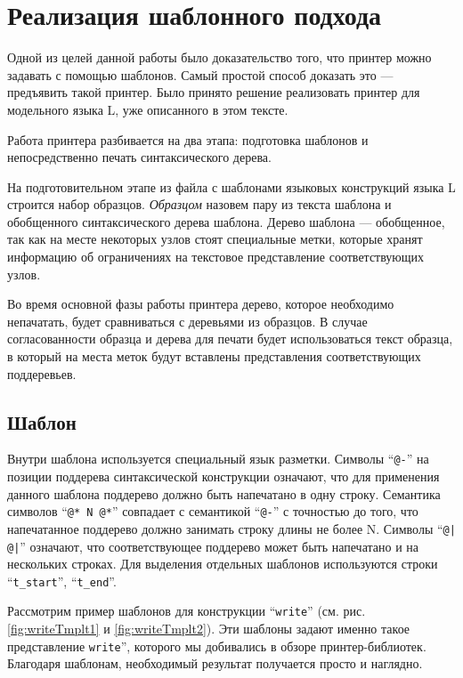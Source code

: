 \section{Реализация шаблонного подхода}

Одной из целей данной работы было доказательство того, что принтер можно задавать с помощью шаблонов.
Самый простой способ доказать это --- предъявить такой принтер. Было принято решение реализовать принтер для модельного языка L, уже описанного в этом тексте.

Работа принтера разбивается на два этапа: подготовка шаблонов и непосредственно печать синтаксического дерева.

На подготовительном этапе из файла с шаблонами языковых конструкций языка L строится набор образцов. \textit{Образцом} назовем пару из текста шаблона и обобщенного синтаксического дерева шаблона. Дерево шаблона --- обобщенное, так как на месте некоторых узлов стоят специальные метки, которые хранят информацию об ограничениях на текстовое представление соответствующих узлов.

Во время основной фазы работы принтера дерево, которое необходимо непачатать, будет сравниваться с деревьями из образцов. В случае согласованности образца и дерева для печати будет использоваться текст образца, в который на места меток будут вставлены представления соответствующих поддеревьев.

\subsection{Шаблон}

Внутри шаблона используется специальный язык разметки. Символы “\lstinline{@-}” на позиции поддерева синтаксической конструкции означают, что для применения данного шаблона поддерево должно быть напечатано в одну строку. Семантика символов “\lstinline{@* N @*}” совпадает с семантикой “\lstinline{@-}” с точностью до того, что напечатанное поддерево должно занимать строку длины не более N. Символы “\lstinline{@| @|}” означают, что соответствующее поддерево может быть напечатано и на нескольких строках. Для выделения отдельных шаблонов используются строки “\lstinline{t_start}”, “\lstinline{t_end}”.

Рассмотрим пример шаблонов для конструкции “\lstinline{write}” (см. рис. \ref{fig:writeTmplt1} и \ref{fig:writeTmplt2}).
Эти шаблоны задают именно такое представление \lstinline{write}”, которого мы добивались в обзоре принтер-библиотек.
Благодаря шаблонам, необходимый результат получается просто и наглядно.

